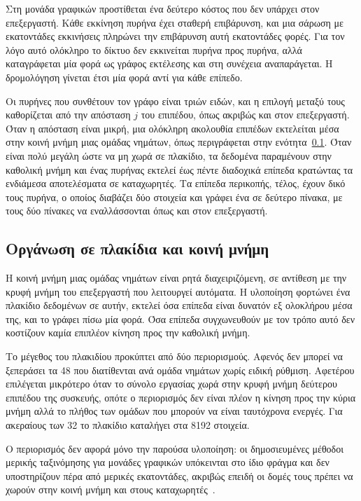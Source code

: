 Στη μονάδα γραφικών προστίθεται ένα δεύτερο κόστος που δεν υπάρχει στον
επεξεργαστή. Κάθε εκκίνηση πυρήνα έχει σταθερή επιβάρυνση, και μια σάρωση με
εκατοντάδες εκκινήσεις πληρώνει την επιβάρυνση αυτή εκατοντάδες φορές. Για τον
λόγο αυτό ολόκληρο το δίκτυο δεν εκκινείται πυρήνα προς πυρήνα, αλλά
καταγράφεται μία φορά ως γράφος εκτέλεσης και στη συνέχεια αναπαράγεται. Η
δρομολόγηση γίνεται έτσι μία φορά αντί για κάθε επίπεδο.

Οι πυρήνες που συνθέτουν τον γράφο είναι τριών ειδών, και η επιλογή μεταξύ τους
καθορίζεται από την απόσταση $j$ του επιπέδου, όπως ακριβώς και στον
επεξεργαστή. Όταν η απόσταση είναι μικρή, μια ολόκληρη ακολουθία επιπέδων
εκτελείται μέσα στην κοινή μνήμη μιας ομάδας νημάτων, όπως περιγράφεται στην
ενότητα~\ref{sec:gpu-bitonic-tiles}. Όταν είναι πολύ μεγάλη ώστε να μη χωρά σε
πλακίδιο, τα δεδομένα παραμένουν στην καθολική μνήμη και ένας πυρήνας εκτελεί
έως πέντε διαδοχικά επίπεδα κρατώντας τα ενδιάμεσα αποτελέσματα σε καταχωρητές.
Τα επίπεδα περικοπής, τέλος, έχουν δικό τους πυρήνα, ο οποίος διαβάζει δύο
στοιχεία και γράφει ένα σε δεύτερο πίνακα, με τους δύο πίνακες να
εναλλάσσονται όπως και στον επεξεργαστή.

\subsection{Οργάνωση σε πλακίδια και κοινή μνήμη}
\label{sec:gpu-bitonic-tiles}

Η κοινή μνήμη μιας ομάδας νημάτων είναι ρητά διαχειριζόμενη, σε αντίθεση με την
κρυφή μνήμη του επεξεργαστή που λειτουργεί αυτόματα. Η υλοποίηση φορτώνει ένα
πλακίδιο δεδομένων σε αυτήν, εκτελεί όσα επίπεδα είναι δυνατόν εξ ολοκλήρου
μέσα της, και το γράφει πίσω μία φορά. Όσα επίπεδα συγχωνευθούν με τον τρόπο
αυτό δεν κοστίζουν καμία επιπλέον κίνηση προς την καθολική μνήμη.

Το μέγεθος του πλακιδίου προκύπτει από δύο περιορισμούς. Αφενός δεν μπορεί να
ξεπεράσει τα 48  που διατίθενται ανά ομάδα νημάτων χωρίς ειδική
ρύθμιση. Αφετέρου επιλέγεται μικρότερο όταν το σύνολο εργασίας χωρά στην κρυφή
μνήμη δεύτερου επιπέδου της συσκευής, οπότε ο περιορισμός δεν είναι πλέον η
κίνηση προς την κύρια μνήμη αλλά το πλήθος των ομάδων που μπορούν να είναι
ταυτόχρονα ενεργές. Για ακεραίους των 32  το πλακίδιο καταλήγει στα 8192
στοιχεία.

Ο περιορισμός δεν αφορά μόνο την παρούσα υλοποίηση: οι δημοσιευμένες μέθοδοι
μερικής ταξινόμησης για μονάδες γραφικών υπόκεινται στο ίδιο φράγμα και δεν
υποστηρίζουν  πέρα από μερικές εκατοντάδες, ακριβώς επειδή οι δομές τους
πρέπει να χωρούν στην κοινή μνήμη και στους καταχωρητές~\cite{shanbhag2018,zhang2023gputopk}.

